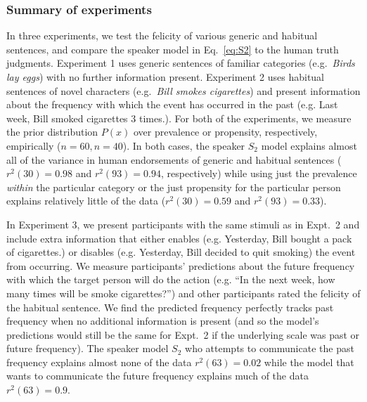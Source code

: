 \documentclass[11pt,letterpaper]{article}
\begin{document}
\subsubsection*{Summary of experiments}


In three experiments, we test the felicity of various generic and habitual sentences, and compare the speaker model in Eq.~\ref{eq:S2} to the human truth judgments. 
Experiment 1 uses generic sentences of familiar categories (e.g.~\emph{Birds lay eggs}) with no further information present.
Experiment 2 uses habitual sentences of novel characters (e.g.~\emph{Bill smokes cigarettes}) and present information about the frequency with which the event has occurred in the past (e.g. Last week, Bill smoked cigarettes 3 times.). 
For both of the experiments, we measure the prior distribution $P(x)$ over prevalence or propensity, respectively, empirically ($n=60, n=40$).
In both cases, the speaker $S_2$ model explains almost all of the variance in human endorsements of generic and habitual sentences ($r^2(30) = 0.98$ and $r^2(93) = 0.94$, respectively) while using just the prevalence \emph{within} the particular category or the just propensity for the particular person explains relatively little of the data ($r^2(30) = 0.59$ and $r^2(93) = 0.33$).

In Experiment 3, we present participants with the same stimuli as in Expt.~2 and include extra information that either enables (e.g. Yesterday, Bill bought a pack of cigarettes.) or disables (e.g. Yesterday, Bill decided to quit smoking) the event from occurring. 
We measure participants' predictions about the future frequency with which the target person will do the action (e.g. ``In the next week, how many times will be smoke cigarettes?'') and other participants rated the felicity of the habitual sentence. 
We find the predicted frequency perfectly tracks past frequency when no additional information is present (and so the model's predictions would still be the same for Expt.~2 if the underlying scale was past or future frequency).
The speaker model $S_2$ who attempts to communicate the past frequency explains almost none of the data $r^2(63)=0.02$ while the model that wants to communicate the future frequency explains much of the data $r^2(63)=0.9$.
\end{document}
